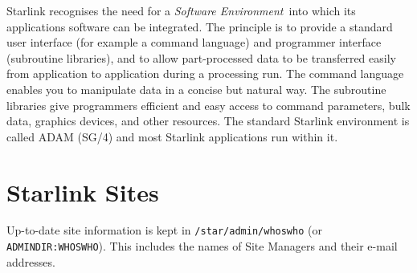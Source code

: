 Starlink recognises the need for a {\em Software Environment}\, into which its
applications software can be integrated.
The principle is to provide a standard user interface (for example a command
language) and programmer interface (subroutine libraries), and to allow
part-processed data to be transferred easily from application to application
during a processing run.
The command language enables you to manipulate data in a concise but natural
way.
The subroutine libraries give programmers efficient and easy access to
command parameters, bulk data, graphics devices, and other resources.
The standard Starlink environment is called ADAM (SG/4) and most Starlink
applications run within it.

\appendix

\newpage

\section {Starlink Sites}

Up-to-date site information is kept in {\tt /star/\-admin/\-whoswho}
(or {\tt ADMINDIR:WHOSWHO}).
This includes the names of Site Managers and their e-mail addresses.


